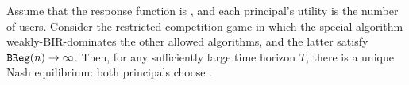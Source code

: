 \begin{corollary}\label{cor:SoftMax-strong}
Assume that the response function is \SoftMaxRandom, and each principal's  utility is the number of users. Consider the restricted competition game in which the special algorithm \alg weakly-BIR-dominates the other allowed algorithms, and the latter satisfy $\mathtt{BReg}(n)\to \infty$. Then, for any sufficiently large time horizon $T$, there is a unique Nash equilibrium: both principals choose \alg.
\end{corollary}



